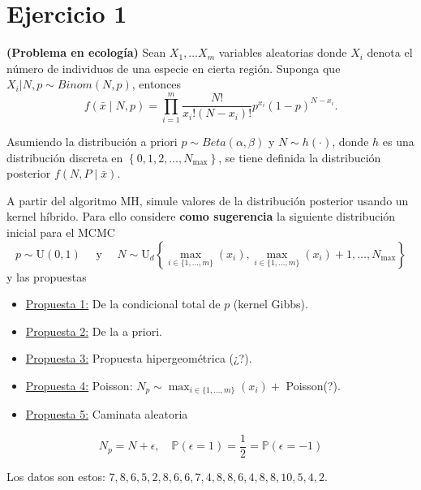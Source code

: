 \section{Ejercicio 1}
\textbf{(Problema en ecología)} Sean $X_{1}, \ldots X_{m}$ variables aleatorias donde $X_{i}$ denota el número de individuos de una especie en cierta región. Suponga que $X_{i} | N, p \sim Binom(N, p)$, entonces
	\begin{equation} \label{eq:1}
		f(\bar{x} \mid N, p)=\prod_{i=1}^{m} \frac{N!}{x_{i}!\left(N-x_{i}\right)!} p^{x_{i}}(1-p)^{N-x_{i}} .
	\end{equation}
	
	Asumiendo la distribución a priori $p \sim Beta(\alpha, \beta)$ y $N \sim h(\cdot)$, donde $h$ es una distribución discreta en $\left\{0,1,2, \dots, N_{\max }\right\}$, se tiene definida la distribución posterior $f(N, P \mid \bar{x})$.
	
	A partir del algoritmo MH, simule valores de la distribución posterior usando un kernel híbrido. Para ello considere \textbf{como sugerencia} la 
	siguiente distribución inicial para el MCMC
	\begin{equation}\label{eq:2}
		p \sim \mathrm{U}(0,1) \quad \text { y } \quad N \sim \mathrm{U}_{d}\left\{\max _{i \in\{1, \ldots, m\}}\left(x_{i}\right), \max _{i \in\{1, \ldots, m\}}\left(x_{i}\right)+1, \ldots, N_{\max }\right\}
	\end{equation}
	y las propuestas
	\begin{itemize}
		\item \underline{Propuesta 1:} De la condicional total de $p$ (kernel Gibbs).
		\item \underline{Propuesta 2:} De la a priori.
		\item \underline{Propuesta 3:} Propuesta hipergeométrica (¿?).
		\item \underline{Propuesta 4:} Poisson: $N_{p} \sim \max _{i \in\{1, \ldots, m\}}\left(x_{i}\right)+$ Poisson(?).
		\item \underline{Propuesta 5:} Caminata aleatoria
	\end{itemize}
	\begin{equation} \label{eq:3}
		N_{p}=N+\epsilon, \quad \mathbb{P}(\epsilon=1)=\frac{1}{2}=\mathbb{P}(\epsilon=-1)
	\end{equation}
	
	Los datos son estos: $7,8,6,5,2,8,6,6,7,4,8,8,6,4,8,8,10,5,4,2$.
	
